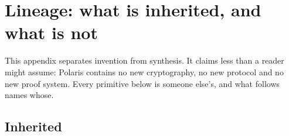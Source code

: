 \section{Lineage: what is inherited, and what is not}
\label{sec:lineage}

This appendix separates invention from synthesis. It claims less than a reader might assume: Polaris contains no new
cryptography, no new protocol and no new proof system. Every primitive below is someone else's, and
what follows names whose.

\subsection{Inherited}

